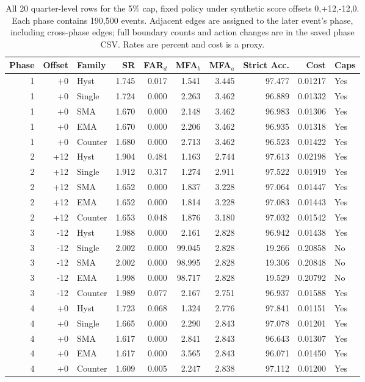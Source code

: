 \begin{table}[!htbp]
\centering
\caption{All 20 quarter-level rows for the 5\% cap, fixed policy under synthetic score offsets 0,+12,-12,0. Each phase contains 190,500 events. Adjacent edges are assigned to the later event's phase, including cross-phase edges; full boundary counts and action changes are in the saved phase CSV. Rates are percent and cost is a proxy.}
\label{tab:supp_shift_phase_5_fixed}
\scriptsize
\setlength{\tabcolsep}{2.6pt}
\begin{tabular}{rrlrrrrrrl}
\toprule
Phase & Offset & Family & SR & FAR$_d$ & MFA$_b$ & MFA$_a$ & Strict Acc. & Cost & Caps\\
\midrule
1 & +0 & Hyst & 1.745 & 0.017 & 1.541 & 3.445 & 97.477 & 0.01217 & Yes \\
1 & +0 & Single & 1.724 & 0.000 & 2.263 & 3.462 & 96.889 & 0.01332 & Yes \\
1 & +0 & SMA & 1.670 & 0.000 & 2.148 & 3.462 & 96.983 & 0.01306 & Yes \\
1 & +0 & EMA & 1.670 & 0.000 & 2.206 & 3.462 & 96.935 & 0.01318 & Yes \\
1 & +0 & Counter & 1.680 & 0.000 & 2.713 & 3.462 & 96.523 & 0.01422 & Yes \\
2 & +12 & Hyst & 1.904 & 0.484 & 1.163 & 2.744 & 97.613 & 0.02198 & Yes \\
2 & +12 & Single & 1.912 & 0.317 & 1.274 & 2.911 & 97.522 & 0.01919 & Yes \\
2 & +12 & SMA & 1.652 & 0.000 & 1.837 & 3.228 & 97.064 & 0.01447 & Yes \\
2 & +12 & EMA & 1.652 & 0.000 & 1.814 & 3.228 & 97.083 & 0.01443 & Yes \\
2 & +12 & Counter & 1.653 & 0.048 & 1.876 & 3.180 & 97.032 & 0.01542 & Yes \\
3 & -12 & Hyst & 1.988 & 0.000 & 2.161 & 2.828 & 96.942 & 0.01438 & Yes \\
3 & -12 & Single & 2.002 & 0.000 & 99.045 & 2.828 & 19.266 & 0.20858 & No \\
3 & -12 & SMA & 2.002 & 0.000 & 98.995 & 2.828 & 19.306 & 0.20848 & No \\
3 & -12 & EMA & 1.998 & 0.000 & 98.717 & 2.828 & 19.529 & 0.20792 & No \\
3 & -12 & Counter & 1.989 & 0.077 & 2.167 & 2.751 & 96.937 & 0.01588 & Yes \\
4 & +0 & Hyst & 1.723 & 0.068 & 1.324 & 2.776 & 97.841 & 0.01151 & Yes \\
4 & +0 & Single & 1.665 & 0.000 & 2.290 & 2.843 & 97.078 & 0.01201 & Yes \\
4 & +0 & SMA & 1.617 & 0.000 & 2.841 & 2.843 & 96.643 & 0.01307 & Yes \\
4 & +0 & EMA & 1.617 & 0.000 & 3.565 & 2.843 & 96.071 & 0.01450 & Yes \\
4 & +0 & Counter & 1.609 & 0.005 & 2.247 & 2.838 & 97.112 & 0.01200 & Yes \\
\bottomrule
\end{tabular}
\end{table}
